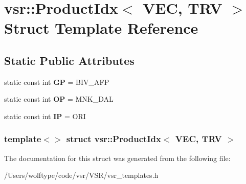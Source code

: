 \hypertarget{structvsr_1_1_product_idx_3_01_v_e_c_00_01_t_r_v_01_4}{\section{vsr\-:\-:Product\-Idx$<$ V\-E\-C, T\-R\-V $>$ Struct Template Reference}
\label{structvsr_1_1_product_idx_3_01_v_e_c_00_01_t_r_v_01_4}
}
\subsection*{Static Public Attributes}
\begin{DoxyCompactItemize}
\item 
\hypertarget{structvsr_1_1_product_idx_3_01_v_e_c_00_01_t_r_v_01_4_aa2bb8211cbbd718e9f839cd64777ad02}{static const int {\bfseries G\-P} = B\-I\-V\-\_\-\-A\-F\-P}\label{structvsr_1_1_product_idx_3_01_v_e_c_00_01_t_r_v_01_4_aa2bb8211cbbd718e9f839cd64777ad02}

\item 
\hypertarget{structvsr_1_1_product_idx_3_01_v_e_c_00_01_t_r_v_01_4_af8b29409775d3400987294ff8a099085}{static const int {\bfseries O\-P} = M\-N\-K\-\_\-\-D\-A\-L}\label{structvsr_1_1_product_idx_3_01_v_e_c_00_01_t_r_v_01_4_af8b29409775d3400987294ff8a099085}

\item 
\hypertarget{structvsr_1_1_product_idx_3_01_v_e_c_00_01_t_r_v_01_4_a9ad38f17a60b815ddd00cf1418a2b997}{static const int {\bfseries I\-P} = O\-R\-I}\label{structvsr_1_1_product_idx_3_01_v_e_c_00_01_t_r_v_01_4_a9ad38f17a60b815ddd00cf1418a2b997}

\end{DoxyCompactItemize}
\subsubsection*{template$<$$>$ struct vsr\-::\-Product\-Idx$<$ V\-E\-C, T\-R\-V $>$}



The documentation for this struct was generated from the following file\-:\begin{DoxyCompactItemize}
\item 
/\-Users/wolftype/code/vsr/\-V\-S\-R/vsr\-\_\-templates.\-h\end{DoxyCompactItemize}
